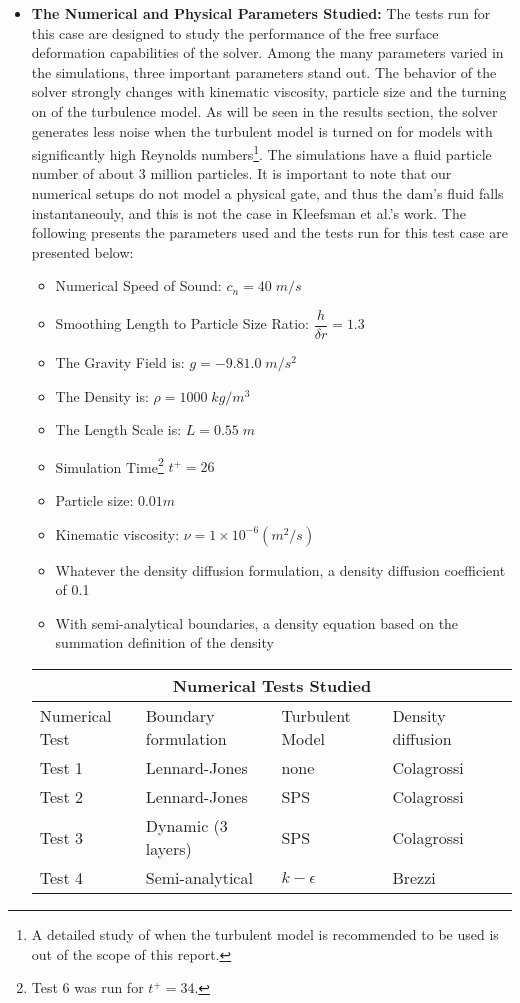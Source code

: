 \documentclass{../GPUSPHtemplate}
\begin{document}
\begin{itemize}
\item \textbf{The Numerical and Physical Parameters Studied:} The tests run for this case are designed to study the performance
  of the free surface deformation capabilities of the solver. Among the many parameters varied in the simulations,
  three important parameters stand out. The behavior of the solver strongly changes with kinematic viscosity,
  particle size and the turning on of the turbulence model. As will be seen in the results section,
  the solver generates less noise when the turbulent model is turned on
  for models with significantly high Reynolds numbers\footnote{A detailed study of when the turbulent model is
    recommended to be used is out of the scope of this report.}. The simulations have a fluid particle number
  of about 3 million particles. It is important to note that our numerical
  setups do not model a physical gate, and thus the dam's fluid falls instantaneouly, and this is not the case in
  Kleefsman et al.'s work. The following presents the parameters used and the tests run for this test case are presented below:   
  \begin{itemize}
  \item Numerical Speed of Sound: ${c_n} = 40 \; m/s$
  \item Smoothing Length to Particle Size Ratio: $\dfrac{h}{\delta r}=1.3$ 
  \item The Gravity Field is: $g = -9.81.0 \; {m}/{s^2}$
  \item The Density is: $\rho = 1000 \; {kg}/{m^3} $
  \item The Length Scale is: $L = 0.55 \; m$
  \item Simulation Time\footnote{Test 6 was run for $t^+=34$.} $t^+ = 26 $
  \item Particle size: $0.01m$
  \item Kinematic viscosity: $\nu = 1 \times 10^{-6} (m^2/s)$
  \item Whatever the density diffusion formulation, a density diffusion coefficient of 0.1
  \item With semi-analytical boundaries, a density equation based on the summation definition of the density
  \end{itemize}
  
  \begin{table}[h!]
    \centering
    \begin{tabular}{ |p{3cm}||p{2cm}|p{2cm}|p{2cm}|p{3cm}|  } 
      \hline
      \multicolumn{5}{|c|}{Numerical Tests Studied} \\
      \hline
      Numerical Test & Boundary formulation & Turbulent Model & Density diffusion \\
      \hline
      Test 1 & Lennard-Jones      & none & Colagrossi \\
      Test 2 & Lennard-Jones      & SPS & Colagrossi \\
      Test 3 & Dynamic (3 layers) & SPS  & Colagrossi \\
      Test 4 & Semi-analytical    & $k-\epsilon$ & Brezzi
      \hline
    \end{tabular}
  \end{table}


\end{itemize}
\end{document}
